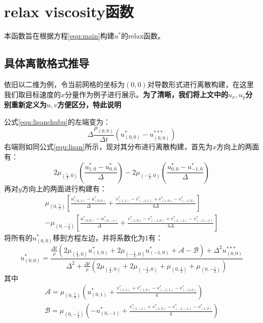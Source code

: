 \documentclass[lang=cn,11pt,a4paper]{elegantpaper}
\begin{document}
\section{relax viscosity函数}
本函数旨在根据方程\ref{equ:main}构建$u^*$的relax函数。
\subsection{具体离散格式推导}
依旧以二维为例，令当前网格的坐标为$(0,0)$对导数形式进行离散构建，在这里我们取目标速度的$x$分量作为例子进行展示。\textbf{为了清晰，我们将上文中的$u_x,u_y$分别重新定义为$u,v$方便区分，特此说明}\par
公式\ref{equ:lisanchubu}的左端变为：
\begin{equation}
    \Delta \frac{\rho_{(0,0)}}{\Delta t}(u^*_{(0,0)}-u^{***}_{(0,0)})
\end{equation}
右端则如同公式\ref{equ:lisan}所示，现对其分布进行离散构建，首先为$x$方向上的两面有：
\begin{equation}
    2\mu_{(\frac{1}{2},0)}(\frac{u^*_{1,0}-u^*_{0,0}}{\Delta})-2\mu_{(-\frac{1}{2},0)}(\frac{u^*_{0,0}-u^*_{-1,0}}{\Delta})
\end{equation}
再对$y$方向上的两面进行构建有：
\begin{equation}
\begin{aligned}
    \mu_{(0,\frac{1}{2})}[\frac{u^*_{(0,1)}-u^*_{(0,0)}}{\Delta}
    +\frac{v^*_{(1,1)}-v^*_{(-1,1)}+v^*_{(1,0)}-v^*_{(-1,0)}}{4\Delta}]\\-\mu_{(0,-\frac{1}{2})}[\frac{u^*_{(0,0)}-u^*_{(0,-1)}}{\Delta}+\frac{v^*_{(1,0)}-v^*_{(-1,0)}+v^*_{(1,-1)}-v^*_{(-1,-1)}}{4\Delta}]
\end{aligned}
\end{equation}
将所有的$u^*_{(0,0)}$移到方程左边，并将系数化为1有：
\begin{equation}
    u^*_{(0,0)} = \frac{\frac{\Delta t}{\rho}(2\mu_{(\frac{1}{2},0)}u^*_{(1,0)}+2\mu_{(-\frac{1}{2},0)}u^*_{(-1,0)}+\mathscr{A}-\mathscr{B})+\Delta^2 u^{***}_{(0,0)}}{\Delta^2+\frac{\Delta t}{\rho}(2\mu_{(\frac{1}{2},0)}+2\mu_{(-\frac{1}{2},0)}+\mu_{(0,\frac{1}{2})}+\mu_{(0,-\frac{1}{2})})}
\end{equation}
其中
\begin{gather}
    \mathscr{A} = \mu_{(0,\frac{1}{2})}(u^*_{(0,1)}+\frac{v^*_{(1,1)}+v^*_{(1,0)}-v^*_{(-1,1)}-v^*_{(-1,0)}}{4})\\
    \mathscr{B} = \mu_{(0,-\frac{1}{2})}(-u^*_{(0,-1)}+\frac{v^*_{(1,-1)}+v^*_{(1,0)}-v^*_{(-1,-1)}-v^*_{(1,0)}}{4})
\end{gather}
\end{document}
